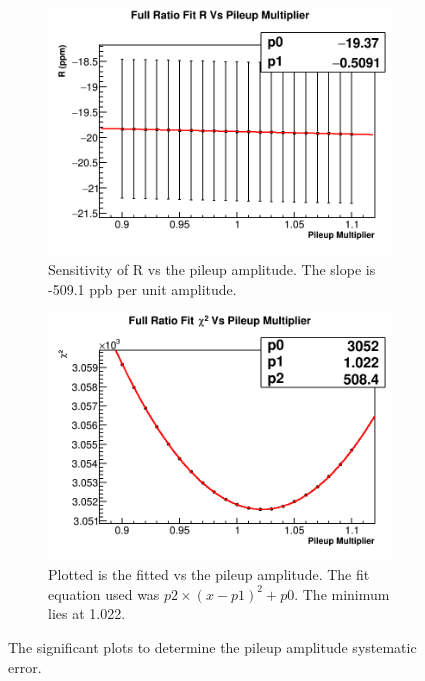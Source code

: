 		\begin{figure}[h]
		\centering
		    \begin{subfigure}[t]{0.45\textwidth}
			    \centering
				\includegraphics[width=\textwidth]{RatioCBO_R_Vs_PileupMultiplier_Canv}
			    \caption{Sensitivity of R vs the pileup amplitude. The slope is -509.1 ppb per unit amplitude.}
		    \end{subfigure}
		    \hspace{4mm}
		    \begin{subfigure}[t]{0.45\textwidth}
			    \centering
				\includegraphics[width=\textwidth]{RatioCBO_Chi2_Vs_PileupMultiplier_Canv}
			    \caption{Plotted is the fitted \chisq vs the pileup amplitude. The fit equation used was $p2 \times (x - p1)^{2} + p0.$ The minimum lies at 1.022.}
		    \end{subfigure}
		\caption[PileupMultiplier]{The significant plots to determine the pileup amplitude systematic error.}
		\label{fig:PileupMultiplier}
		\end{figure}

